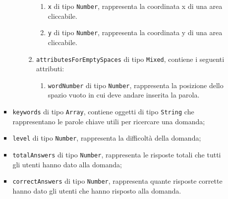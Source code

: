 \begin{itemize}
\begin{itemize}
\begin{itemize}
\begin{itemize}
\begin{enumerate}
\begin{enumerate}
        						\item \texttt{x} di tipo \texttt{Number}, rappresenta la coordinata x di una area cliccabile.  
        						\item \texttt{y} di tipo \texttt{Number}, rappresenta la coordinata y di una area cliccabile.  
						\end{enumerate}    
							\item \texttt{attributesForEmptySpaces} di tipo \texttt{Mixed}, contiene i seguenti attributi:
        					\begin{enumerate}
        						\item \texttt{wordNumber} di tipo \texttt{Number}, rappresenta la posizione dello spazio vuoto in cui deve andare inserita la parola.  
						\end{enumerate}        						  						
					\end{enumerate}
				\end{itemize}			
					\item \texttt{keywords} di tipo \texttt{Array}, contiene oggetti di tipo \texttt{String} che rappresentano le parole chiave utili per ricercare una domanda;	 
			\item \texttt{level} di tipo \texttt{Number}, rappresenta la difficoltà della domanda;
			\item \texttt{totalAnswers} di tipo \texttt{Number}, rappresenta le risposte totali che tutti gli utenti hanno dato alla domanda;
			\item \texttt{correctAnswers} di tipo \texttt{Number}, rappresenta quante risposte corrette hanno dato gli utenti che hanno risposto alla domanda.
		

\end{itemize}
\end{itemize}
\end{itemize}
